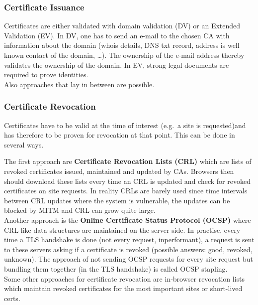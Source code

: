 \subsubsection{Certificate Issuance}
Certificates are either validated with domain validation (DV) or an Extended Validation (EV).
In DV, one has to send an e-mail to the chosen CA with information about the domain (whois details, DNS txt record, address is well known contact of the domain, \dots).
The ownership of the e-mail address thereby validates the ownership of the domain.
In EV, strong legal documents are required to prove identities.\\
Also approaches that lay in between are possible.

\subsubsection{Certificate Revocation}
Certificates have to be valid at the time of interest (e.g.\ a site is requested)and has therefore to be proven for revocation at that point.
This can be done in several ways.

The first approach are \textbf{Certificate Revocation Lists (CRL)} which are lists of revoked certificates issued, maintained and updated by CAs.
Browsers then should download these lists every time an CRL is updated and check for revoked certificates on site requests.
In reality CRLs are barely used since time intervals between CRL updates where the system is vulnerable, the updates can be blocked by MITM and CRL can grow quite large.\\

Another approach is the \textbf{Online Certificate Status Protocol (OCSP)} where CRL-like data structures are maintained on the server-side.
In practise, every time a TLS handshake is done (not every request, inperformant), a request is sent to these servers asking if a certificate is revoked (possible answers: good, revoked, unknown).
The approach of not sending OCSP requests for every site request but bundling them together (in the TLS handshake) is called OCSP stapling.\\

Some other approaches for certificate revocation are in-browser revocation lists which maintain revoked certificates for the most important sites or short-lived certs.

